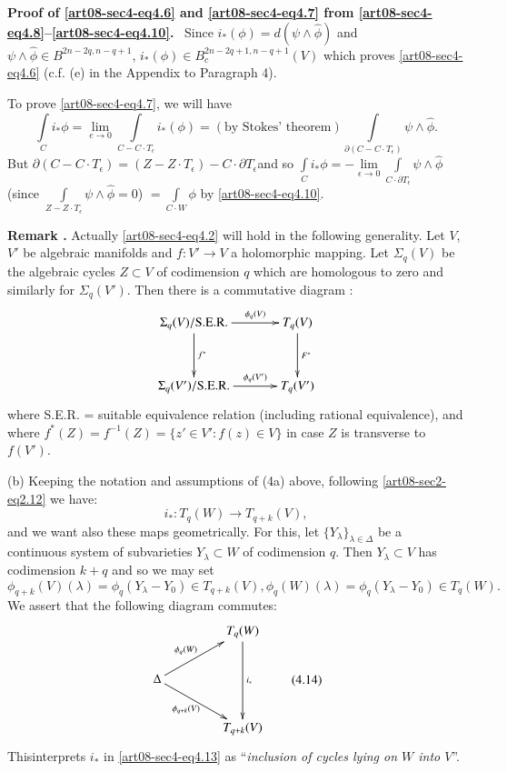\medskip
\noindent
{\bf Proof of \eqref{art08-sec4-eq4.6} and \eqref{art08-sec4-eq4.7} from \eqref{art08-sec4-eq4.8}--\eqref{art08-sec4-eq4.10}.}~ Since $i_{*}(\phi)=d(\psi\wedge \widehat{\phi})$ and $\psi\wedge\widehat{\phi}\in B^{2n-2q,n-q+1}$, $i_{*}(\phi)\in B^{2n-2q+1,n-q+1}_{c}(V)$ which proves \eqref{art08-sec4-eq4.6} (c.f. (e) in the Appendix to Paragraph 4).

To prove \eqref{art08-sec4-eq4.7}, we will have
$$
\int\limits_{C}i_{*}\phi=\lim\limits_{e\to 0}\int\limits_{C-C\cdot T_{\epsilon}}i_{*}(\phi)=(\text{by Stokes' theorem})\int\limits_{\partial(C-C\cdot T_{\epsilon})}\psi\wedge \widehat{\phi}.
$$
But $\partial(C-C\cdot T_{\epsilon})=(Z-Z\cdot T_{\epsilon})-C\cdot \partial T_{\epsilon}$\pageoriginale and so $\int\limits_{C}i_{*}\phi=-\lim\limits_{\epsilon\to 0}\int\limits_{C\cdot \partial T_{\epsilon}}\psi \wedge \widehat{\phi}$ (since $\int\limits_{Z-Z\cdot T_{\epsilon}}\psi \wedge \widehat{\phi}=0$) $=\int\limits_{C\cdot W}\phi$ by \eqref{art08-sec4-eq4.10}.

\medskip
\noindent
{\bf Remark .\label{art08-sec4-rem4.12}}
Actually \eqref{art08-sec4-eq4.2} will hold in the following generality. Let $V$, $V'$ be algebraic manifolds and $f:V'\to V$ a holomorphic mapping. Let $\Sigma_{q}(V)$ be the algebraic cycles $Z\subset V$ of codimension $q$ which are homologous to zero and similarly for $\Sigma_{q}(V')$. Then there is a commutative diagram :
\[
\xymatrix@=1.2cm{
\Sigma_{q}(V)/\text{S.E.R.}\ar[d]^-{f^{*}}\ar[r]^-{\phi_{q}(V)} & T_{q}(V)\ar[d]^-{F^{*}}\\
\Sigma_{q}(V')/\text{S.E.R.}\ar[r]^-{\phi_{q}(V')} & T_{q}(V')
}
\]
where S.E.R. = suitable equivalence relation (including rational equivalence), and where $f^{*}(Z)=f^{-1}(Z)=\{z'\in V':f(z)\in V\}$ in case $Z$ is transverse to $f(V')$.

(b) Keeping the notation and assumptions of (4a) above, following \eqref{art08-sec2-eq2.12} we have:
\begin{equation*}
i_{*}:T_{q}(W)\to T_{q+k}(V),\tag{4.13}\label{art08-sec4-eq4.13}
\end{equation*}
and we want also these maps geometrically. For this, let $\{Y_{\lambda}\}_{\lambda\in \Delta}$ be a continuous system of subvarieties $Y_{\lambda}\subset W$ of codimension $q$. Then $Y_{\lambda}\subset V$ has codimension $k+q$ and so we may set
$$
\phi_{q+k}(V)(\lambda)=\phi_{q}(Y_{\lambda}-Y_{0})\in T_{q+k}(V),\phi_{q}(W)(\lambda)=\phi_{q}(Y_{\lambda}-Y_{0})\in T_{q}(W).
$$
We assert that the following diagram commutes:
\begin{equation*}
\vcenter{\xymatrix@C=1.5cm{
 & T_{q}(W)\ar[dd]^-{i_{*}}\\
\Delta\ar[ur]^-{\phi_{q}(W)}\ar[dr]_-{\phi_{q+k}(V)} &\\
 & T_{q+k}(V)
}}\tag{4.14}\label{art08-sec4-eq4.14}
\end{equation*}
This\pageoriginale interprets $i_{*}$ in \eqref{art08-sec4-eq4.13} as ``{\em inclusion of cycles lying on $W$ into $V$}''.

